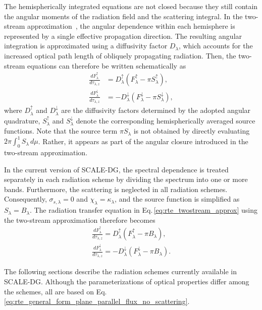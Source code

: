 The hemispherically integrated equations are not closed because they still contain the angular moments of the radiation field and the scattering integral. 
In the two-stream approximation~\citep{Toon1989}, the angular dependence within each hemisphere is represented by a single effective propagation direction. 
The resulting angular integration is approximated using a diffusivity factor $D_\lambda$,
which accounts for the increased optical path length of obliquely propagating radiation. 
Then, the two-stream equations can therefore be written schematically as
\begin{align}
\frac{dF_\lambda^\uparrow}{d\tau_{\lambda,z}}
&= D_\lambda^\uparrow \left( F_\lambda^\uparrow -\pi S_\lambda^\uparrow \right), \\
\frac{dF_\lambda^\downarrow}{d\tau_{\lambda,z}}
&=
-D_\lambda^\downarrow \left( F_\lambda^\downarrow -\pi S_\lambda^\downarrow \right),
\label{eq:rte_twostream_approx}
\end{align}
where $D_\lambda^\uparrow$ and $D_\lambda^\downarrow$ are the diffusivity factors determined by the adopted angular quadrature,
$S_\lambda^\uparrow$ and $S_\lambda^\downarrow$ denote the corresponding hemispherically averaged source functions.
Note that the source term $\pi S_\lambda$ is not obtained by directly evaluating $2\pi\int_0^1 S_\lambda\,d\mu$. 
Rather, it appears as part of the angular closure introduced in the two-stream approximation.


In the current version of SCALE-DG, 
the spectral dependence is treated separately in each radiation scheme by dividing the spectrum into one or more bands.
Furthermore, the scattering is neglected in all radiation schemes.
Consequently, 
$\sigma_{s,\lambda} = 0$ and $\chi_\lambda = \kappa_\lambda$, and the source function is simplified as $S_\lambda = B_\lambda$.
The radiation transfer equation in Eq.\,\eqref{eq:rte_twostream_approx} using the two-stream approximation therefore becomes
\begin{align}
  \frac{dF_\lambda^\uparrow}{d\tau_{\lambda,z}} = D^\uparrow_\lambda \left( F_\lambda^\uparrow - \pi B_\lambda \right), \\
  \frac{dF_\lambda^\downarrow}{d\tau_{\lambda,z}} = -D^\downarrow_\lambda \left( F_\lambda^\downarrow - \pi B_\lambda \right).
\label{eq:rte_general_form_plane_parallel_flux_no_scattering}
\end{align}


The following sections describe the radiation schemes currently available in SCALE-DG.
Although the parameterizations of optical properties differ among the schemes, 
all are based on Eq.\,\eqref{eq:rte_general_form_plane_parallel_flux_no_scattering}.


